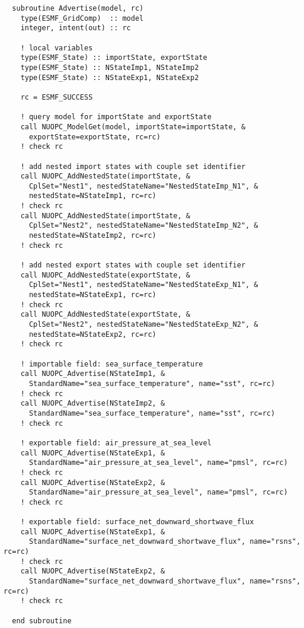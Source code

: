 \begin{verbatim}
  subroutine Advertise(model, rc)
    type(ESMF_GridComp)  :: model
    integer, intent(out) :: rc

    ! local variables
    type(ESMF_State) :: importState, exportState
    type(ESMF_State) :: NStateImp1, NStateImp2
    type(ESMF_State) :: NStateExp1, NStateExp2

    rc = ESMF_SUCCESS

    ! query model for importState and exportState
    call NUOPC_ModelGet(model, importState=importState, &
      exportState=exportState, rc=rc)
    ! check rc

    ! add nested import states with couple set identifier
    call NUOPC_AddNestedState(importState, &
      CplSet="Nest1", nestedStateName="NestedStateImp_N1", &
      nestedState=NStateImp1, rc=rc)
    ! check rc
    call NUOPC_AddNestedState(importState, &
      CplSet="Nest2", nestedStateName="NestedStateImp_N2", &
      nestedState=NStateImp2, rc=rc)
    ! check rc

    ! add nested export states with couple set identifier
    call NUOPC_AddNestedState(exportState, &
      CplSet="Nest1", nestedStateName="NestedStateExp_N1", &
      nestedState=NStateExp1, rc=rc)
    ! check rc
    call NUOPC_AddNestedState(exportState, &
      CplSet="Nest2", nestedStateName="NestedStateExp_N2", &
      nestedState=NStateExp2, rc=rc)
    ! check rc

    ! importable field: sea_surface_temperature
    call NUOPC_Advertise(NStateImp1, &
      StandardName="sea_surface_temperature", name="sst", rc=rc)
    ! check rc
    call NUOPC_Advertise(NStateImp2, &
      StandardName="sea_surface_temperature", name="sst", rc=rc)
    ! check rc

    ! exportable field: air_pressure_at_sea_level
    call NUOPC_Advertise(NStateExp1, &
      StandardName="air_pressure_at_sea_level", name="pmsl", rc=rc)
    ! check rc
    call NUOPC_Advertise(NStateExp2, &
      StandardName="air_pressure_at_sea_level", name="pmsl", rc=rc)
    ! check rc

    ! exportable field: surface_net_downward_shortwave_flux
    call NUOPC_Advertise(NStateExp1, &
      StandardName="surface_net_downward_shortwave_flux", name="rsns", rc=rc)
    ! check rc
    call NUOPC_Advertise(NStateExp2, &
      StandardName="surface_net_downward_shortwave_flux", name="rsns", rc=rc)
    ! check rc

  end subroutine
\end{verbatim}


